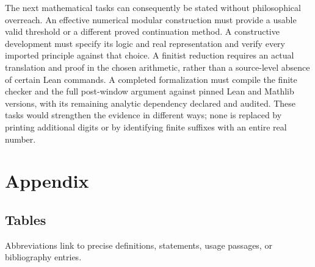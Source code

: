 \documentclass[11pt,reqno]{amsart}
\theoremstyle{blueplain}
\numberwithin{equation}{section}
\begin{document}
The next mathematical tasks can consequently be stated without
philosophical overreach. An effective numerical modular construction must
provide a usable valid threshold or a different proved continuation
method. A constructive development must specify its logic and real
representation and verify every imported principle against that choice.
A finitist reduction requires an actual translation and proof in the
chosen arithmetic, rather than a source-level absence of certain Lean
commands. A completed formalization must compile the finite checker and
the full post-window argument against pinned Lean and Mathlib versions,
with its remaining analytic dependency declared and audited. These tasks
would strengthen the evidence in different ways; none is replaced by
printing additional digits or by identifying finite suffixes with an
entire real number.

\section{Appendix}\label{sec:appendix}
\subsection{Tables}\label{sec:appendix-tables}

Abbreviations link to precise definitions, statements, usage passages, or bibliography entries.

\begingroup
\small
\setlength{\tabcolsep}{5pt}
\end{document}
